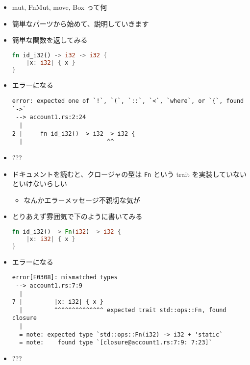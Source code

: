 \documentclass[dvipdfmx,11pt]{beamer}
\begin{document}
\begin{frame}
  \begin{itemize}
  \item mut, FnMut, move, Box って何
  \item 簡単なパーツから始めて、説明していきます
  \end{itemize}
\end{frame}

\begin{frame}[fragile]
  \begin{itemize}
  \item 簡単な関数を返してみる
    \begin{lstlisting}[language={Rust}]
fn id_i32() -> i32 -> i32 {
    |x: i32| { x }
}
    \end{lstlisting}
  \item エラーになる
\begin{Verbatim}[fontsize=\scriptsize]
error: expected one of `!`, `(`, `::`, `<`, `where`, or `{`, found `->`
 --> account1.rs:2:24
  |
2 |     fn id_i32() -> i32 -> i32 {
  |                        ^^
\end{Verbatim}
  \item ???

  \end{itemize}
\end{frame}

\begin{frame}[fragile]
  \begin{itemize}
  \item ドキュメントを読むと、クロージャの型は \verb+Fn+ という trait を実装していないといけないらしい
    \begin{itemize}
    \item なんかエラーメッセージ不親切な気が
    \end{itemize}
  \item とりあえず雰囲気で下のように書いてみる
    \begin{lstlisting}[language={Rust}]
fn id_i32() -> Fn(i32) -> i32 {
    |x: i32| { x }
}
    \end{lstlisting}
  \item エラーになる
\begin{Verbatim}[fontsize=\scriptsize]
error[E0308]: mismatched types
 --> account1.rs:7:9
  |
7 |         |x: i32| { x }
  |         ^^^^^^^^^^^^^^ expected trait std::ops::Fn, found closure
  |
  = note: expected type `std::ops::Fn(i32) -> i32 + 'static`
  = note:    found type `[closure@account1.rs:7:9: 7:23]`
\end{Verbatim}
  \item ???
  \end{itemize}
\end{frame}
\end{document}
